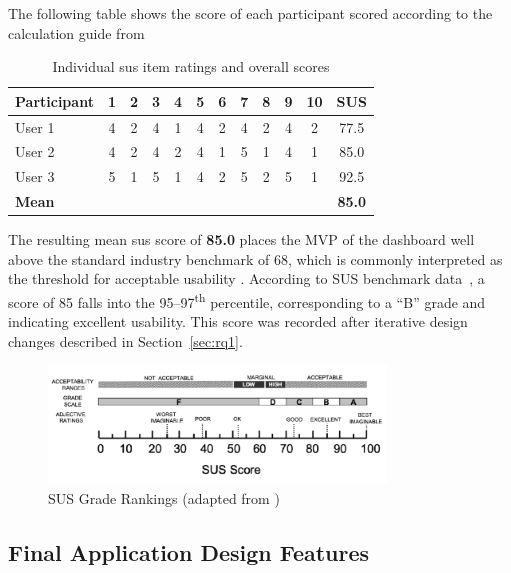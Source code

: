 The following table shows the score of each participant scored according to the calculation guide from 

\begin{table}[H]
\centering
\begin{tabular}{@{}lccccccccccc@{}}
\toprule
\textbf{Participant} & \textbf{1} & \textbf{2} & \textbf{3} & \textbf{4} & \textbf{5} & \textbf{6} & \textbf{7} & \textbf{8} & \textbf{9} & \textbf{10} & \textbf{SUS} \\
\midrule
User 1 & 4 & 2 & 4 & 1 & 4 & 2 & 4 & 2 & 4 & 2 & 77.5 \\
User 2 & 4 & 2 & 4 & 2 & 4 & 1 & 5 & 1 & 4 & 1 & 85.0 \\
User 3 & 5 & 1 & 5 & 1 & 4 & 2 & 5 & 2 & 5 & 1 & 92.5 \\
\midrule
\textbf{Mean} &  &  &  &  &  &  &  &  &  &  & \textbf{85.0} \\
\bottomrule
\end{tabular}
\caption{Individual \acrshort{sus} item ratings and overall scores}
\label{tab:sus-scores}
\end{table}


The resulting mean \acrshort{sus} score of \textbf{85.0} places the MVP of the dashboard well above the standard industry benchmark of 68, which is commonly interpreted as the threshold for acceptable usability \autocite{MeasuringSUS2011}. According to SUS benchmark data~\autocite{Bangor2009}, a score of 85 falls into the 95–97\textsuperscript{th} percentile, corresponding to a “B” grade and indicating excellent usability. This score was recorded after iterative design changes described in Section~\ref{sec:rq1}.

\begin{figure}[H]
    \centering
    \includegraphics[width=0.8\textwidth]{figures/Grade-rankings-of-SUS-scores-from-An-Empirical-Evaluation-of-the-System-Usability.png}
    \caption{SUS Grade Rankings (adapted from \cite{Bangor2009})}
    \label{fig:sus_scores}
\end{figure}

\subsection{Final Application Design Features}
\label{subsec:final_app_design}


